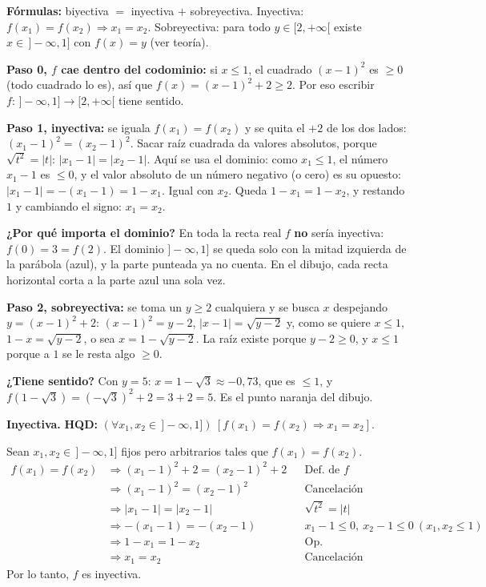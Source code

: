 \documentclass[11pt]{article}
\begin{document}
\begin{explica}
\textbf{Fórmulas:} biyectiva $=$ inyectiva $+$ sobreyectiva. Inyectiva: $f(x_1)=f(x_2)\Rightarrow x_1=x_2$. Sobreyectiva: para todo $y\in[2,+\infty[$ existe $x\in\,]-\infty,1]$ con $f(x)=y$ (ver teoría).

\textbf{Paso 0, $f$ cae dentro del codominio:} si $x\le1$, el cuadrado $(x-1)^2$ es $\ge0$ (todo cuadrado lo es), así que $f(x)=(x-1)^2+2\ge2$. Por eso escribir $f:\,]-\infty,1]\to[2,+\infty[$ tiene sentido.

\textbf{Paso 1, inyectiva:} se iguala $f(x_1)=f(x_2)$ y se quita el $+2$ de los dos lados: $(x_1-1)^2=(x_2-1)^2$. Sacar raíz cuadrada da valores absolutos, porque $\sqrt{t^2}=|t|$: $|x_1-1|=|x_2-1|$. Aquí se usa el dominio: como $x_1\le1$, el número $x_1-1$ es $\le0$, y el valor absoluto de un número negativo (o cero) es su opuesto: $|x_1-1|=-(x_1-1)=1-x_1$. Igual con $x_2$. Queda $1-x_1=1-x_2$, y restando $1$ y cambiando el signo: $x_1=x_2$.

\textbf{¿Por qué importa el dominio?} En toda la recta real $f$ \textbf{no} sería inyectiva: $f(0)=3=f(2)$. El dominio $]-\infty,1]$ se queda solo con la mitad izquierda de la parábola (azul), y la parte punteada ya no cuenta. En el dibujo, cada recta horizontal corta a la parte azul una sola vez.

\textbf{Paso 2, sobreyectiva:} se toma un $y\ge2$ cualquiera y se busca $x$ despejando $y=(x-1)^2+2$: $(x-1)^2=y-2$, $|x-1|=\sqrt{y-2}$ y, como se quiere $x\le1$, $1-x=\sqrt{y-2}$, o sea $x=1-\sqrt{y-2}$. La raíz existe porque $y-2\ge0$, y $x\le1$ porque a $1$ se le resta algo $\ge0$.

\textbf{¿Tiene sentido?} Con $y=5$: $x=1-\sqrt3\approx-0{,}73$, que es $\le1$, y $f(1-\sqrt3)=(-\sqrt3)^2+2=3+2=5$. Es el punto naranja del dibujo.
\end{explica}

\textbf{Inyectiva.} \textbf{HQD:} $(\forall x_1,x_2\in\,]-\infty,1])\ [f(x_1)=f(x_2)\Rightarrow x_1=x_2]$.

Sean $x_1,x_2\in\,]-\infty,1]$ fijos pero arbitrarios tales que $f(x_1)=f(x_2)$.
\begin{align*}
f(x_1)=f(x_2) &\Rightarrow (x_1-1)^2+2=(x_2-1)^2+2 && \text{Def.\ de }f\\
&\Rightarrow (x_1-1)^2=(x_2-1)^2 && \text{Cancelación}\\
&\Rightarrow |x_1-1|=|x_2-1| && \sqrt{t^2}=|t|\\
&\Rightarrow -(x_1-1)=-(x_2-1) && x_1-1\le0,\ x_2-1\le0\ (x_1,x_2\le1)\\
&\Rightarrow 1-x_1=1-x_2 && \text{Op.}\\
&\Rightarrow x_1=x_2 && \text{Cancelación}
\end{align*}
Por lo tanto, $f$ es inyectiva.
\end{document}
